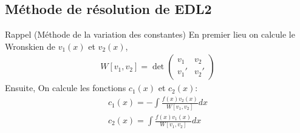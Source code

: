 \subsection{Méthode de résolution de EDL2}

\begin{parag}{Rappel (Méthode de la variation des constantes)}
    En premier lieu on calcule le Wronskien de $v_1(x)$ et $v_2(x)$, 
    \begin{align*}
        W[v_1, v_2] = \det \begin{pmatrix}
            v_1  & v_2 \\
            v_1' & v_2'
        \end{pmatrix}
    \end{align*}
    Ensuite, On calcule les fonctions $c_1(x)$ et $c_2(x)$:
    \begin{align*}
        c_1(x) = -\int \frac{f(x)v_2(x)}{W[v_1, v_2]}dx \\
        c_2(x) = \int \frac{f(x)v_1(x)}{W[v_1, v_2]}dx
    \end{align*}
\end{parag}


